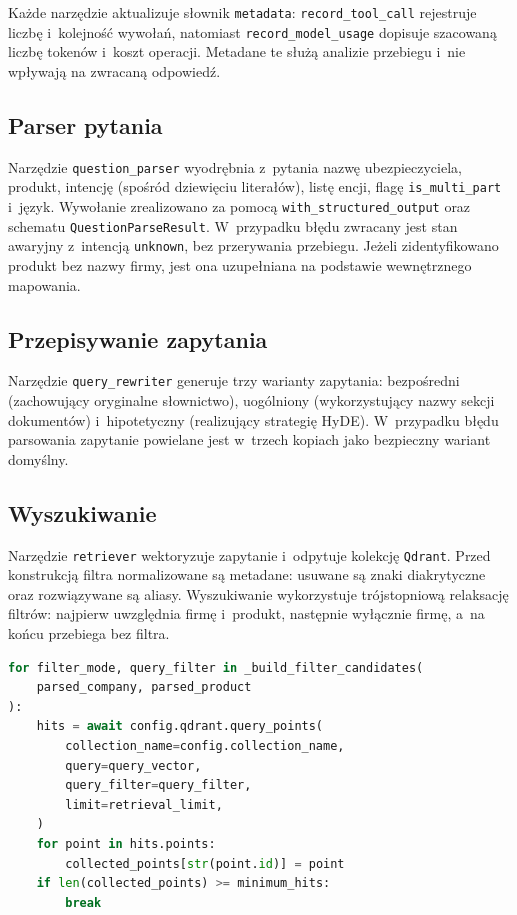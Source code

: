 Każde narzędzie aktualizuje słownik \texttt{metadata}:
\texttt{record\_tool\_call} rejestruje liczbę i~kolejność wywołań, natomiast
\texttt{record\_model\_usage} dopisuje szacowaną liczbę tokenów i~koszt
operacji. Metadane te służą analizie przebiegu i~nie wpływają na zwracaną
odpowiedź.

\subsection{Parser pytania}\label{subsec:parser-pytania}

Narzędzie \texttt{question\_parser} wyodrębnia z~pytania nazwę ubezpieczyciela,
produkt, intencję (spośród dziewięciu literałów), listę encji, flagę
\texttt{is\_multi\_part} i~język. Wywołanie zrealizowano za pomocą
\texttt{with\_structured\_output} oraz schematu \texttt{QuestionParseResult}.
W~przypadku błędu zwracany jest stan awaryjny z~intencją \texttt{unknown}, bez
przerywania przebiegu. Jeżeli zidentyfikowano produkt bez nazwy firmy, jest ona
uzupełniana na podstawie wewnętrznego mapowania.

\subsection{Przepisywanie zapytania}\label{subsec:przepisywanie-zapytania}

Narzędzie \texttt{query\_rewriter} generuje trzy warianty zapytania:
bezpośredni (zachowujący oryginalne słownictwo), uogólniony (wykorzystujący
nazwy sekcji dokumentów) i~hipotetyczny (realizujący strategię HyDE).
W~przypadku błędu parsowania zapytanie powielane jest w~trzech kopiach jako
bezpieczny wariant domyślny.

\subsection{Wyszukiwanie}\label{subsec:wyszukiwanie}

Narzędzie \texttt{retriever} wektoryzuje zapytanie i~odpytuje kolekcję
\texttt{Qdrant}. Przed konstrukcją filtra normalizowane są metadane: usuwane są
znaki diakrytyczne oraz rozwiązywane są aliasy. Wyszukiwanie wykorzystuje
trójstopniową relaksację filtrów: najpierw uwzględnia firmę i~produkt,
następnie wyłącznie firmę, a~na końcu przebiega bez filtra.

\begin{lstlisting}[language=Python,
  caption={Relaksacja filtrów wyszukiwania},
  label={lst:relaksacja-filtrow-wyszukiwania}]
for filter_mode, query_filter in _build_filter_candidates(
    parsed_company, parsed_product
):
    hits = await config.qdrant.query_points(
        collection_name=config.collection_name,
        query=query_vector,
        query_filter=query_filter,
        limit=retrieval_limit,
    )
    for point in hits.points:
        collected_points[str(point.id)] = point
    if len(collected_points) >= minimum_hits:
        break
\end{lstlisting}

